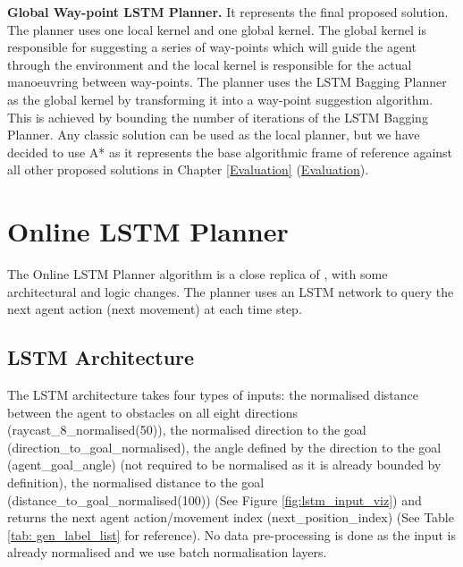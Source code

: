 \textbf{Global Way-point LSTM Planner.} It represents the final proposed solution. The planner uses one local kernel and one global kernel. The global kernel is responsible for suggesting a series of way-points which will guide the agent through the environment and the local kernel is responsible for the actual manoeuvring between way-points. The planner uses the LSTM Bagging Planner as the global kernel by transforming it into a way-point suggestion algorithm. This is achieved by bounding the number of iterations of the LSTM Bagging Planner. Any classic solution can be used as the local planner, but we have decided to use A* as it represents the base algorithmic frame of reference against all other proposed solutions in Chapter \ref {Evaluation} (\hyperref[Evaluation]{Evaluation}).

\pagebreak

\section{Online LSTM Planner}

The Online LSTM Planner algorithm is a close replica of \cite{nicola2018lstm}, with some architectural and logic changes. The planner uses an LSTM network to query the next agent action (next movement) at each time step.

\subsection{LSTM Architecture}

The LSTM architecture takes four types of inputs: the normalised distance between the agent to obstacles on all eight directions (raycast\_8\_normalised(50)), the normalised direction to the goal (direction\_to\_goal\_normalised), the angle defined by the direction to the goal (agent\_goal\_angle) (not required to be normalised as it is already bounded by definition), the normalised distance to the goal (distance\_to\_goal\_normalised(100)) (See Figure \ref{fig:lstm_input_viz}) and returns the next agent action/movement index (next\_position\_index) (See Table \ref{tab: gen_label_list} for reference). No data pre-processing is done as the input is already normalised and we use batch normalisation layers. 

